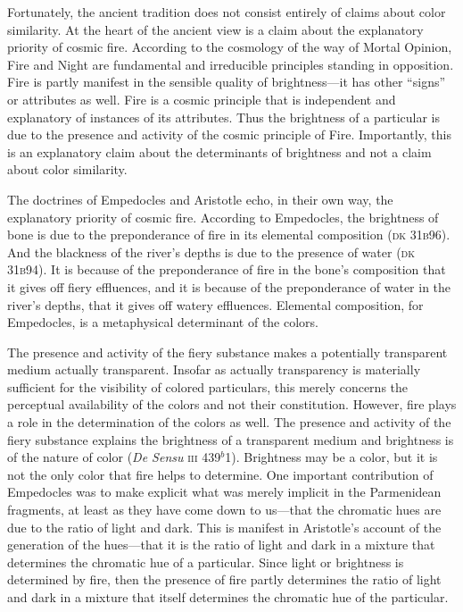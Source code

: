 Fortunately, the ancient tradition does not consist entirely of claims about color similarity. At the heart of the ancient view is a claim about the explanatory priority of cosmic fire. According to the cosmology of the way of Mortal Opinion, Fire and Night are fundamental and irreducible principles standing in opposition. Fire is partly manifest in the sensible quality of brightness---it has other ``signs'' or attributes as well. Fire is a cosmic principle that is independent and explanatory of instances of its attributes. Thus the brightness of a particular is due to the presence and activity of the cosmic principle of Fire. Importantly, this is an explanatory claim about the determinants of brightness and not a claim about color similarity. 

The doctrines of Empedocles and Aristotle echo, in their own way, the explanatory priority of cosmic fire. According to Empedocles, the brightness of bone is due to the preponderance of fire in its elemental composition (\textsc{dk} 31\textsc{b}96). And the blackness of the river's depths is due to the presence of water (\textsc{dk} 31\textsc{b}94). It is because of the preponderance of fire in the bone's composition that it gives off fiery effluences, and it is because of the preponderance of water in the river's depths, that it gives off watery effluences. Elemental composition, for Empedocles, is a metaphysical determinant of the colors.


The presence and activity of the fiery substance makes a potentially transparent medium actually transparent. Insofar as actually transparency is materially sufficient for the visibility of colored particulars, this merely concerns the perceptual availability of the colors and not their constitution. However, fire plays a role in the determination of the colors as well. The presence and activity of the fiery substance explains the brightness of a transparent medium and brightness is of the nature of color (\emph{De Sensu} \textsc{iii} 439\( ^{b} \)1). Brightness may be a color, but it is not the only color that fire helps to determine. One important contribution of Empedocles was to make explicit what was merely implicit in the Parmenidean fragments, at least as they have come down to us---that the chromatic hues are due to the ratio of light and dark. This is manifest in Aristotle's account of the generation of the hues---that it is the ratio of light and dark in a mixture that determines the chromatic hue of a particular. Since light or brightness is determined by fire, then the presence of fire partly determines the ratio of light and dark in a mixture that itself determines the chromatic hue of the particular.

